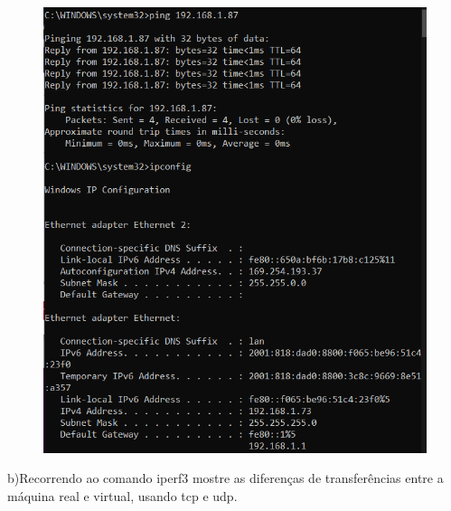 \documentclass{article}
\begin{document}
	\begin{figure}[!htb]
		\centering
		\includegraphics[scale=0.6]{tp_sosd_a2.2}
	\end{figure}
	
	\newpage
	b)Recorrendo ao comando iperf3 mostre as diferenças de transferências entre a
	máquina real e virtual, usando tcp e udp.
	\vspace{2 em}
	
\end{document}

